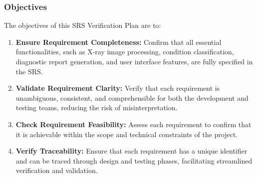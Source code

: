 \documentclass[12pt, titlepage]{article}
\begin{document}
\subsubsection{Objectives}
The objectives of this SRS Verification Plan are to:
\begin{enumerate}
  \item \textbf{Ensure Requirement Completeness:} Confirm that all essential functionalities, such as X-ray image processing, condition classification, diagnostic report generation, and user interface features, are fully specified in the SRS.
  \item \textbf{Validate Requirement Clarity:} Verify that each requirement is unambiguous, consistent, and comprehensible for both the development and testing teams, reducing the risk of misinterpretation.
  \item \textbf{Check Requirement Feasibility:} Assess each requirement to confirm that it is achievable within the scope and technical constraints of the project.
  \item \textbf{Verify Traceability:} Ensure that each requirement has a unique identifier and can be traced through design and testing phases, facilitating streamlined verification and validation.
\end{enumerate}
\end{document}
